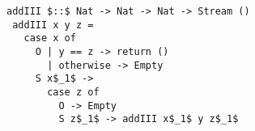\begin{figure}[!t]
  \centering
  \begin{minipage}{\columnwidth}
    \begin{lstlisting}[frame=tb]
 addIII $::$ Nat -> Nat -> Nat -> Stream ()
 addIII x y z =
   case x of
     O | y == z -> return ()
       | otherwise -> Empty
     S x$_1$ ->
       case z of
         O -> Empty
         S z$_1$ -> addIII x$_1$ y z$_1$
    \end{lstlisting}
  \end{minipage}
\end{figure}